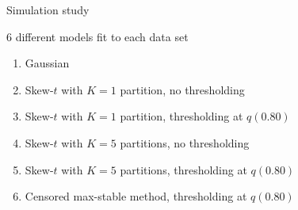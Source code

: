\documentclass{beamer}
\begin{document}
\begin{frame}{Simulation study}
\begin{adjustwidth}{1em}{0em}
  6 different models fit to each data set \vspace{0.5em}
  \begin{enumerate}[1.] \setlength{\itemsep}{0.5em}
    \item Gaussian
    \item Skew-$t$ with $K = 1$ partition, no thresholding
    \item Skew-$t$ with $K = 1$ partition, thresholding at $q(0.80)$
    \item Skew-$t$ with $K = 5$ partitions, no thresholding
    \item Skew-$t$ with $K = 5$ partitions, thresholding at $q(0.80)$
    \item Censored max-stable method, thresholding at $q(0.80)$
  \end{enumerate}
\end{adjustwidth}
\end{frame}

\end{document}

